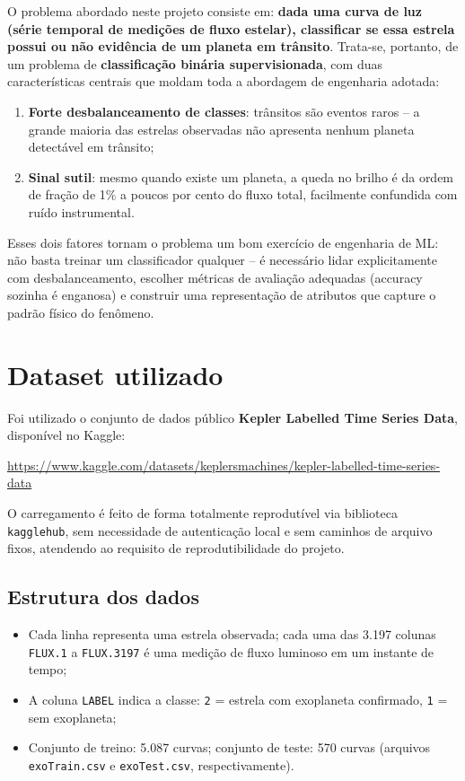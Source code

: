 \documentclass[12pt,a4paper]{article}
\begin{document}
O problema abordado neste projeto consiste em: \textbf{dada uma curva de luz (série temporal de medições de fluxo estelar), classificar se essa estrela possui ou não evidência de um planeta em trânsito}. Trata-se, portanto, de um problema de \textbf{classificação binária supervisionada}, com duas características centrais que moldam toda a abordagem de engenharia adotada:

\begin{enumerate}[leftmargin=1.5cm]
    \item \textbf{Forte desbalanceamento de classes}: trânsitos são eventos raros -- a grande maioria das estrelas observadas não apresenta nenhum planeta detectável em trânsito;
    \item \textbf{Sinal sutil}: mesmo quando existe um planeta, a queda no brilho é da ordem de fração de 1\% a poucos por cento do fluxo total, facilmente confundida com ruído instrumental.
\end{enumerate}

Esses dois fatores tornam o problema um bom exercício de engenharia de ML: não basta treinar um classificador qualquer -- é necessário lidar explicitamente com desbalanceamento, escolher métricas de avaliação adequadas (accuracy sozinha é enganosa) e construir uma representação de atributos que capture o padrão físico do fenômeno.


\section{Dataset utilizado}

Foi utilizado o conjunto de dados público \textbf{Kepler Labelled Time Series Data}, disponível no Kaggle:

\begin{center}
\url{https://www.kaggle.com/datasets/keplersmachines/kepler-labelled-time-series-data}
\end{center}

O carregamento é feito de forma totalmente reprodutível via biblioteca \texttt{kagglehub}, sem necessidade de autenticação local e sem caminhos de arquivo fixos, atendendo ao requisito de reprodutibilidade do projeto.

\subsection*{Estrutura dos dados}

\begin{itemize}[leftmargin=1.5cm]
    \item Cada linha representa uma estrela observada; cada uma das 3.197 colunas \texttt{FLUX.1} a \texttt{FLUX.3197} é uma medição de fluxo luminoso em um instante de tempo;
    \item A coluna \texttt{LABEL} indica a classe: \texttt{2} = estrela com exoplaneta confirmado, \texttt{1} = sem exoplaneta;
    \item Conjunto de treino: 5.087 curvas; conjunto de teste: 570 curvas (arquivos \texttt{exoTrain.csv} e \texttt{exoTest.csv}, respectivamente).
\end{itemize}
\end{document}
